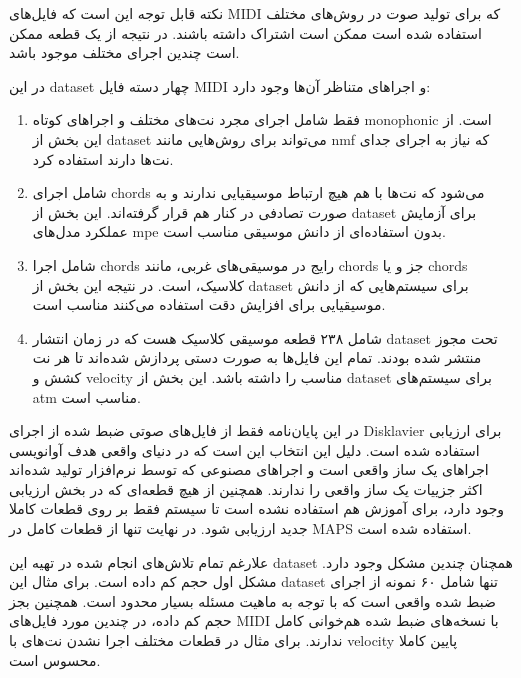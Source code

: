 نکته قابل توجه این است که فایل‌های \gls{MIDI} که برای تولید صوت در روش‌های مختلف
استفاده شده است ممکن است اشتراک داشته باشند. در نتیجه از یک قطعه ممکن است چندین
اجرای مختلف موجود باشد.

در این \gls{dataset} چهار دسته فایل \gls{MIDI} و اجراهای متناظر آن‌ها وجود دارد:
\begin{enumerate}
    \item فقط شامل اجرای مجرد نت‌های مختلف و اجراهای کوتاه
    \gls{monophonic} است. از این بخش از \gls{dataset} می‌تواند برای روش‌هایی
    مانند \gls{nmf} که نیاز به اجرای جدای نت‌ها دارند استفاده کرد.

    \item  شامل اجرای \glspl{chord} می‌شود که نت‌ها با هم هیچ ارتباط
    موسیقیایی ندارند و به صورت تصادفی در کنار هم قرار گرفته‌اند. این بخش از
    \gls{dataset} برای آزمایش عملکرد مدل‌های \gls{mpe} بدون استفاده‌ای از دانش
    موسیقی مناسب است.

    \item شامل اجرا \glspl{chord} رایج در موسیقی‌های غربی، مانند \glspl{chord}
    جز و یا \glspl{chord} کلاسیک، است. در نتیجه این بخش از \gls{dataset} برای
    سیستم‌هایی که از دانش موسیقیایی برای افزایش  دقت استفاده می‌کنند مناسب است.

    \item شامل ۲۳۸ قطعه موسیقی کلاسیک هست که در زمان انتشار \gls{dataset} تحت
    مجوز  منتشر شده بودند. تمام این فایل‌ها به صورت دستی
    پردازش شده‌اند تا هر نت کشش و \gls{velocity} مناسب را داشته باشد. این بخش از
    \gls{dataset} برای سیستم‌های \gls{atm} مناسب است.
\end{enumerate}

در این پایان‌نامه فقط از فایل‌های صوتی ضبط شده از اجرای Disklavier برای ارزیابی
استفاده شده است. دلیل این انتخاب این است که در دنیای واقعی هدف آوانویسی اجراهای
یک ساز واقعی است و اجراهای مصنوعی که توسط نرم‌افزار تولید شده‌اند اکثر جزییات یک
ساز واقعی را ندارند. همچنین از هیچ قطعه‌ای که در بخش ارزیابی وجود دارد، برای
آموزش هم استفاده نشده است تا سیستم فقط بر روی قطعات کاملا جدید ارزیابی شود. در
نهایت تنها از قطعات کامل در MAPS استفاده شده است.

علارغم تمام تلاش‌های انجام شده در تهیه این \gls{dataset} همچنان چندین مشکل وجود
دارد. مشکل اول حجم کم داده است. برای مثال این \gls{dataset} تنها شامل ۶۰ نمونه
از اجرای ضبط شده واقعی است که با توجه به ماهیت مسئله بسیار محدود است. همچنین بجز
حجم کم داده، در چندین مورد فایل‌های \gls{MIDI} با نسخه‌های ضبط شده هم‌خوانی کامل
ندارند. برای مثال در قطعات مختلف اجرا نشدن نت‌های با \gls{velocity} پایین کاملا
محسوس است.

